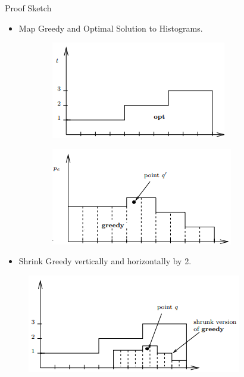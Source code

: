 \documentclass{beamer}
\begin{document}
\begin{frame}{Proof Sketch}
    \begin{itemize}
         \item Map Greedy and Optimal Solution to Histograms. 
    \end{itemize}
    \begin{figure}
            \centering
                \begin{subfigure}
                  \centering
                  \includegraphics[width=.4\linewidth]{histogram_opt.png}
                  \label{fig:sub1}
                \end{subfigure}%
                \begin{subfigure}
                  \centering
                  \includegraphics[width=.4\linewidth]{histogram_greedy.png}
                  \label{fig:sub2}
                \end{subfigure}%
            \label{fig:histograms}
        \end{figure}
    \begin{itemize}
         \item Shrink Greedy vertically and horizontally by 2. 
    \end{itemize}
         \begin{figure}
            \centering
            \includegraphics[width=.6\linewidth]{histogram_fit.png}
            \label{fig:my_label}
        \end{figure}
\end{frame}
\end{document}
